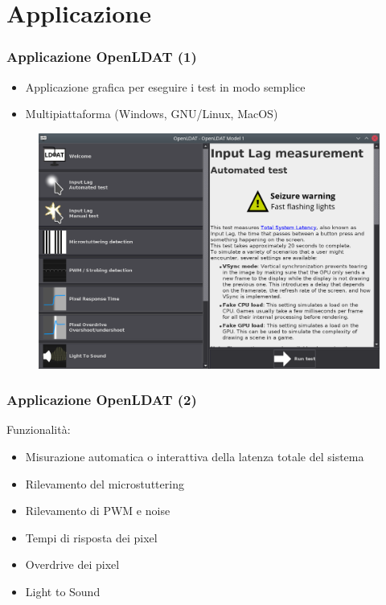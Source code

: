 \documentclass[xcolor={x11names}]{beamer}
\begin{document}
\section{Applicazione}
\begin{frame}
	\frametitle{Applicazione OpenLDAT (1)}
	\begin{itemize}
        \item \alert{Applicazione grafica} per eseguire i test in modo semplice
        \item \alert{Multipiattaforma} (Windows, GNU/Linux, MacOS)
    \end{itemize}
	\begin{figure}
		\centering \includegraphics[height=0.7\textheight]{Applicazione_files/gui_mainMenu2.png}
	\end{figure}
\end{frame}
\begin{frame}
	\frametitle{Applicazione OpenLDAT (2)}
	Funzionalità: \begin{itemize}
		\item Misurazione automatica o interattiva della \alert{latenza totale del sistema}
		\item \alert{Rilevamento del microstuttering}
		\item \alert{Rilevamento di PWM e noise}
		\item \alert{Tempi di risposta dei pixel}
		\item \alert{Overdrive dei pixel}
		\item \alert{Light to Sound}
	\end{itemize}
\end{frame}
\end{document}
